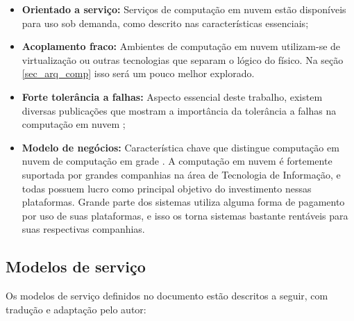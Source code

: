 \documentclass[
	12pt,				%
	oneside,			%
	a4paper,			%
	chapter=TITLE,		%
	english,			%
	french,				%
	spanish,			%
	brazil				%
	]{abntex2}
\begin{document}
\begin{itemize}
    \item \textbf{Orientado a serviço:} Serviços de computação em nuvem estão disponíveis para uso sob demanda, como descrito nas características essenciais;
    \item \textbf{Acoplamento fraco:} Ambientes de computação em nuvem utilizam-se de virtualização ou outras tecnologias que separam o lógico do físico. Na seção \ref{sec_arq_comp} isso será um pouco melhor explorado.
    \item \textbf{Forte tolerância a falhas:} Aspecto essencial deste trabalho, existem diversas publicações que mostram a importância da tolerância a falhas na computação em nuvem \cite{jhawar2012fault, ataallah2015fault, amin2015review, cheraghlou2016survey};
    \item \textbf{Modelo de negócios:} Característica chave que distingue computação em nuvem de computação em grade \cite[p. 278]{gong2010characteristics}. A computação em nuvem é fortemente suportada por grandes companhias na área de Tecnologia de Informação, e todas possuem lucro como principal objetivo do investimento nessas plataformas. Grande parte dos sistemas utiliza alguma forma de pagamento por uso de suas plataformas, e isso os torna sistemas bastante rentáveis para suas respectivas companhias.
\end{itemize}

\subsection{Modelos de serviço}\label{modelosserv}

Os modelos de serviço definidos no documento estão descritos a seguir, com tradução e adaptação pelo autor:
\end{document}
